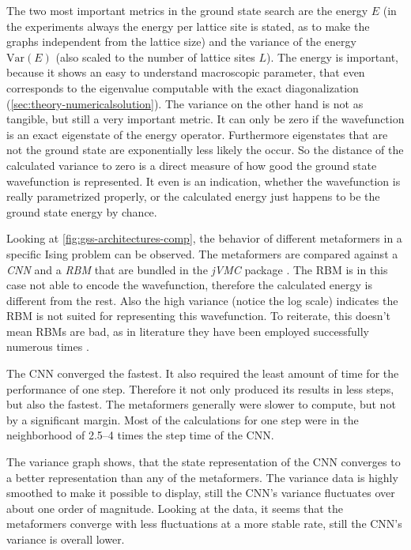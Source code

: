 The two most important metrics in the ground state search are the energy $E$ (in the experiments always the energy per lattice site is stated, as to make the graphs independent from the lattice size) and the variance of the energy $\mathrm{Var}(E)$ (also scaled to the number of lattice sites $L$). 
The energy is important, because it shows an easy to understand macroscopic parameter, that even corresponds to the eigenvalue computable with the exact diagonalization (\autoref{sec:theory-numericalsolution}).
The variance on the other hand is not as tangible, but still a very important metric.
It can only be zero if the wavefunction is an exact eigenstate of the energy operator. 
Furthermore eigenstates that are not the ground state are exponentially less likely the occur.
So the distance of the calculated variance to zero is a direct measure of how good the ground state wavefunction is represented.
It even is an indication, whether the wavefunction is really parametrized properly, or the calculated energy just happens to be the ground state energy by chance.

Looking at \autoref{fig:gss-architectures-comp}, the behavior of different metaformers in a specific Ising problem can be observed.
The metaformers are compared against a \emph{CNN} and a \emph{RBM} that are bundled in the \emph{jVMC} package \cite{jVMCgithub}.
The RBM is in this case not able to encode the wavefunction, therefore the calculated energy is different from the rest. 
Also the high variance (notice the log scale) indicates the RBM is not suited for representing this wavefunction.
To reiterate, this doesn't mean RBMs are bad, as in literature they have been employed successfully numerous times \cite{restrictedBoltzmanMachines}.

The CNN converged the fastest. It also required the least amount of time for the performance of one step.
Therefore it not only produced its results in less steps, but also the fastest.
The metaformers generally were slower to compute, but not by a significant margin. 
Most of the calculations for one step were in the neighborhood of \SIrange[]{2.5}{4}{} times the step time of the CNN.

The variance graph shows, that the state representation of the CNN converges to a better representation than any of the metaformers.
The variance data is highly smoothed to make it possible to display, still the CNN's variance fluctuates over about one order of magnitude.
Looking at the data, it seems that the metaformers converge with less fluctuations at a more stable rate,
still the CNN's variance is overall lower.

